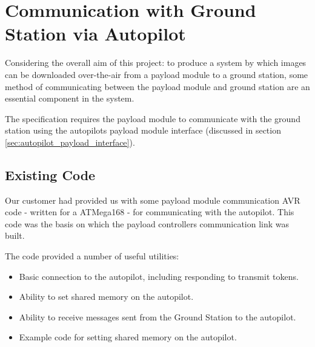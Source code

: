 \section{Communication with Ground Station via Autopilot}
\label{sec:payload controller}
Considering the overall aim of this project: to produce a system by which 
images can be downloaded over-the-air from a payload module to a ground 
station, some method of communicating between the
payload module and ground station are an essential component in the system.

The specification requires the payload
module to communicate with the ground station using the autopilots payload
module interface (discussed in section \ref{sec:autopilot_payload_interface}).


\subsection{Existing Code}
\label{sec:payload_existing_code}
Our customer had provided us with some payload module communication AVR code
- written for a ATMega168 - for communicating with the autopilot. This code
was the basis on which the payload controllers communication link was built.

The code provided a number of useful utilities:
\begin{itemize}
\item Basic connection to the autopilot, including responding to transmit tokens.

\item Ability to set shared memory on the autopilot.

\item Ability to receive messages sent from the Ground Station to the 
autopilot.

\item Example code for setting shared memory on the autopilot.
\end{itemize}

